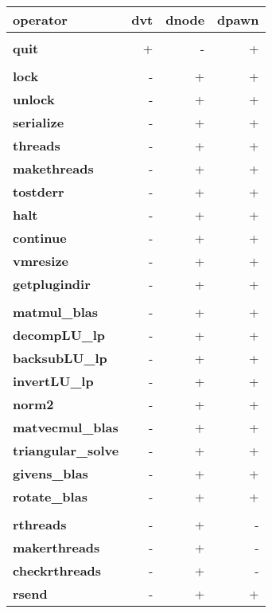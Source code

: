 \begin{tabular}{>{\sffamily\bfseries}l>{\sffamily}r>{\sffamily}r>{\sffamily}r}
operator & dvt & dnode & dpawn \\
\hline\\
quit & + & - & + \\\\
lock & - & + & + \\
unlock & - & + & + \\
serialize & - & + & + \\
threads & - & + & + \\
makethreads & - & + & + \\
tostderr & - & + & + \\
halt & - & + & + \\
continue & - & + & + \\
vmresize & - & + & + \\
getplugindir & - & + & + \\\\
matmul\_blas & - & + & + \\
decompLU\_lp & - & + & + \\
backsubLU\_lp & - & + & + \\
invertLU\_lp & - & + & + \\
norm2 & - & + & + \\
matvecmul\_blas & - & + & + \\
triangular\_solve & - & + & + \\
givens\_blas & - & + & + \\
rotate\_blas & - & + & + \\\\

rthreads & - & + & - \\
makerthreads & - & + & - \\
checkrthreads & - & + & - \\
rsend & - & + & + \\
\end{tabular}

